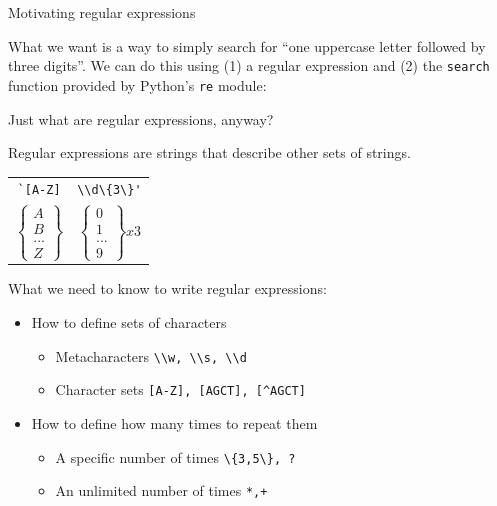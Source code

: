 \documentclass{beamer}
\begin{document}
\begin{frame}{Motivating regular expressions}

What we want is a way to simply search for ``one uppercase letter
followed by three digits''. We can do this using (1) a regular
expression and (2) the \lstinline$search$ function provided
by Python's \lstinline$re$ module:

\vspace{1em}


\end{frame}

\begin{frame}{Just what are regular expressions, anyway?}

Regular expressions are strings that describe other sets of strings.

\begin{center}
\begin{tabular}{cc}
\lstinline$`[A-Z]$ & \lstinline$\\d\{3\}'$  \\
$\left\{\begin{matrix} A \\ B \\ ... \\ Z \end{matrix}\right\}$ &
$\left\{\begin{matrix} 0 \\ 1 \\ ... \\ 9 \end{matrix}\right\} x 3$ \\
\end{tabular}
\end{center}

What we need to know to write regular expressions:
\begin{itemize}
 \item How to define sets of characters
 \begin{itemize}
   \item Metacharacters  \lstinline$\\w, \\s, \\d$ 
   \item Character sets  \lstinline$[A-Z], [AGCT], [^AGCT]$
 \end{itemize}
 \item How to define how many times to repeat them
 \begin{itemize}
   \item A specific number of times \lstinline$\{3,5\}, ?$
   \item An unlimited number of times \lstinline$*,+$
 \end{itemize}
\end{itemize}

\end{frame}
\end{document}
